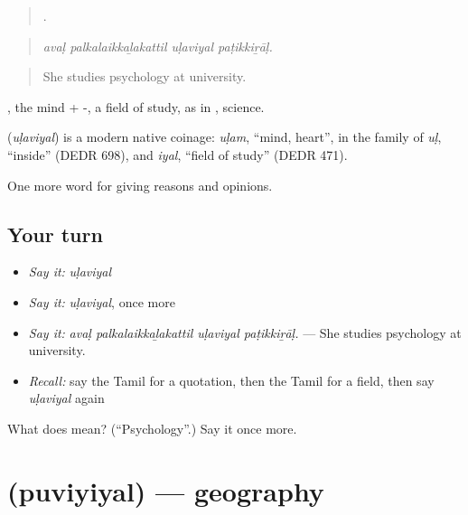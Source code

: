 \begin{quote}
   .
\end{quote}

\begin{quote}
\emph{avaḷ palkalaikkaḻakattil uḷaviyal paṭikkiṟāḷ.}
\end{quote}

\begin{quote}
She studies psychology at university.
\end{quote}

, the mind + -, a field of study, as in , science.

\begin{cousinweb}
\textbf{} (\emph{uḷaviyal}) is a modern native coinage: \emph{uḷam}, \textquotedblleft{}mind, heart\textquotedblright{}, in the family of \emph{uḷ}, \textquotedblleft{}inside\textquotedblright{} (DEDR 698), and \emph{iyal}, \textquotedblleft{}field of study\textquotedblright{} (DEDR 471).
\end{cousinweb}

\begin{grammarlens}[title={What you've built}]
One more word for giving reasons and opinions.
\end{grammarlens}

\subsection*{Your turn}
\begin{itemize}
\raggedright
  \item \emph{Say it:} \emph{uḷaviyal}
  \item \emph{Say it:} \emph{uḷaviyal}, once more
  \item \emph{Say it:} \emph{avaḷ palkalaikkaḻakattil uḷaviyal paṭikkiṟāḷ.} — She studies psychology at university.
  \item \emph{Recall:} say the Tamil for a quotation, then the Tamil for a field, then say \emph{uḷaviyal} again
\end{itemize}

\begin{tcolorbox}[breakable,colback=teal!4,colframe=teal!35!black,title={Before you move on}]
What does  mean? (\textquotedblleft{}Psychology\textquotedblright{}.) Say it once more.
\end{tcolorbox}
\section[\texorpdfstring{\ta{புவியியல்} (puviyiyal)}{புவியியல் (puviyiyal)}]{ (puviyiyal) — geography}

